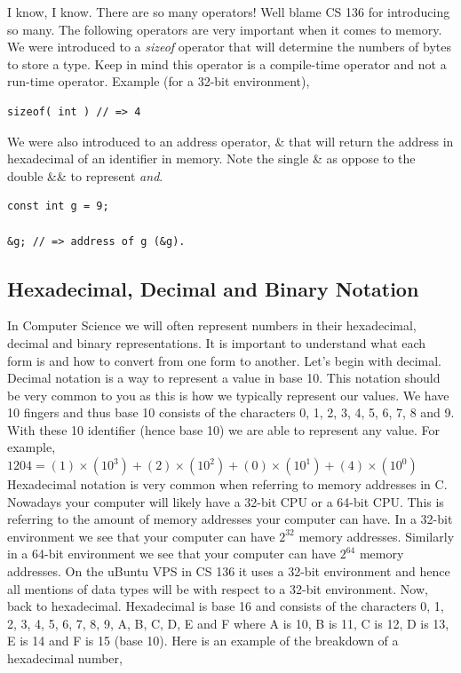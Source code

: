 \documentclass[12pt,extarticle]{article}
\begin{document}
I know, I know. There are so many operators! Well blame CS 136 for introducing so many. The following operators are very important when it comes to memory.\\

We were introduced to a \emph{sizeof} operator that will determine the numbers of bytes to store a type. Keep in mind this operator is a compile-time operator and not a run-time operator. Example (for a 32-bit environment),\\

\lstset {
	language=c
}
\begin{lstlisting}
sizeof( int ) // => 4
\end{lstlisting}

We were also introduced to an address operator, \& that will return the address in hexadecimal of an identifier in memory. Note the single \& as oppose to the double \&\& to represent \textit{and}.\\

\lstset {
	language=c
}
\begin{lstlisting}
const int g = 9;

&g; // => address of g (&g).
\end{lstlisting}

\subsection{Hexadecimal, Decimal and Binary Notation}

In Computer Science we will often represent numbers in their hexadecimal, decimal and binary representations. It is important to understand what each form is and how to convert from one form to another. Let's begin with decimal.\\

Decimal notation is a way to represent a value in base 10. This notation should be very common to you as this is how we typically represent our values. We have 10 fingers and thus base 10 consists of the characters 0, 1, 2, 3, 4, 5, 6, 7, 8 and 9. With these 10 identifier (hence base 10) we are able to represent any value. For example,\\

$1204 = (1) \times (10^{3}) + (2) \times (10^{2}) + (0) \times (10^{1}) + (4) \times (10^{0})$\\

Hexadecimal notation is very common when referring to memory addresses in C. Nowadays your computer will likely have a 32-bit CPU or a 64-bit CPU. This is referring to the amount of memory addresses your computer can have. In a 32-bit environment we see that your computer can have $2^{32}$ memory addresses. Similarly in a 64-bit environment we see that your computer can have $2^{64}$ memory addresses. On the uBuntu VPS in CS 136 it uses a 32-bit environment and hence all mentions of data types will be with respect to a 32-bit environment. Now, back to hexadecimal. Hexadecimal is base 16 and consists of the characters 0, 1, 2, 3, 4, 5, 6, 7, 8, 9, A, B, C, D, E and F where A is 10, B is 11, C is 12, D is 13, E is 14 and F is 15 (base 10). Here is an example of the breakdown of a hexadecimal number,\\
\end{document}
